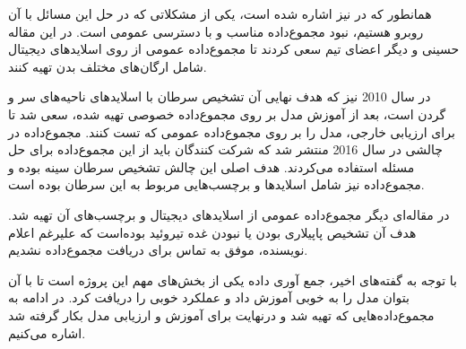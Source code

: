 
همانطور که در \cite{hosseini2019atlas} نیز اشاره شده است، یکی از مشکلاتی که در حل این مسائل با آن روبرو هستیم، نبود مجموع‌داده مناسب و با دسترسی عمومی است. در این مقاله حسینی و دیگر اعضای تیم سعی کردند تا مجموع‌داده عمومی از روی اسلاید‌های دیجیتال شامل ارگان‌های مختلف بدن تهیه کنند.

در سال 2010 \cite{halicek2019head} نیز که هدف نهایی آن تشخیص سرطان با اسلاید‌های ناحیه‌های سر و گردن است، بعد از آموزش مدل بر روی مجموع‌داده خصوصی تهیه شده، سعی شد تا برای ارزیابی خارجی، مدل را بر روی مجموع‌داده عمومی  که تست کنند. مجموع‌داده  در چالشی در سال 2016 منتشر شد که شرکت کنندگان باید از این مجموع‌داده برای حل مسئله استفاده می‌کردند. هدف اصلی این چالش تشخیص سرطان سینه بوده و مجموع‌داده نیز شامل اسلاید‌ها و برچسب‌هایی مربوط به این سرطان بوده است.

در مقاله‌ای دیگر \cite{bohland2021machine} مجموع‌داده عمومی از اسلاید‌های دیجیتال و برچسب‌های آن تهیه شد. هدف آن تشخیص پاپیلاری بودن یا نبودن غده تیروئید بوده‌است که علیرغم اعلام نویسنده، موفق به تماس برای دریافت مجموع‌داده نشدیم.

با توجه به گفته‌های اخیر، جمع آوری داده یکی از بخش‌های مهم این پروژه است تا با آن بتوان مدل را به خوبی آموزش داد و عملکرد خوبی را دریافت کرد.
در ادامه به مجموع‌داده‌هایی که تهیه شد و درنهایت برای آموزش و ارزیابی مدل بکار گرفته شد اشاره می‌کنیم.



